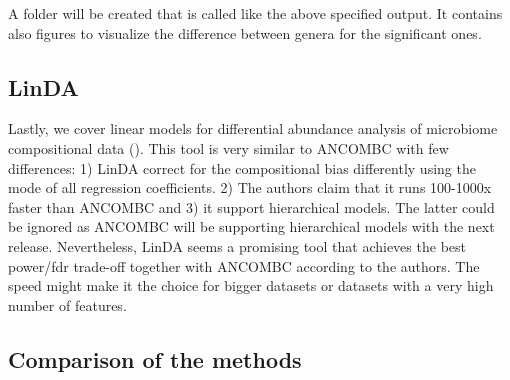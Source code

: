 \documentclass[
]{book}
\newenvironment{Shaded}{\begin{snugshade}}{\end{snugshade}}
\newcommand{\AttributeTok}[1]{\textcolor[rgb]{0.77,0.63,0.00}{#1}}
\newcommand{\CommentTok}[1]{\textcolor[rgb]{0.56,0.35,0.01}{\textit{#1}}}
\newcommand{\DecValTok}[1]{\textcolor[rgb]{0.00,0.00,0.81}{#1}}
\newcommand{\FloatTok}[1]{\textcolor[rgb]{0.00,0.00,0.81}{#1}}
\newcommand{\FunctionTok}[1]{\textcolor[rgb]{0.00,0.00,0.00}{#1}}
\newcommand{\NormalTok}[1]{#1}
\newcommand{\OtherTok}[1]{\textcolor[rgb]{0.56,0.35,0.01}{#1}}
\newcommand{\SpecialCharTok}[1]{\textcolor[rgb]{0.00,0.00,0.00}{#1}}
\newcommand{\StringTok}[1]{\textcolor[rgb]{0.31,0.60,0.02}{#1}}
\begin{document}
A folder will be created that is called like the above specified
output. It contains also figures to visualize the difference between
genera for the significant ones.

\hypertarget{linda}{%
\subsection{LinDA}\label{linda}}

Lastly, we cover linear models for differential abundance analysis of
microbiome compositional data (\citet{Zhou2022}). This tool is very similar
to ANCOMBC with few differences: 1) LinDA correct for the
compositional bias differently using the mode of all regression
coefficients. 2) The authors claim that it runs 100-1000x faster than
ANCOMBC and 3) it support hierarchical models. The latter could be
ignored as ANCOMBC will be supporting hierarchical models with the
next release. Nevertheless, LinDA seems a promising tool that achieves
the best power/fdr trade-off together with ANCOMBC according to the
authors. The speed might make it the choice for bigger datasets or
datasets with a very high number of features.

\begin{Shaded}
\end{Shaded}

\hypertarget{comparison-of-the-methods}{%
\subsection{Comparison of the methods}\label{comparison-of-the-methods}}
\end{document}
